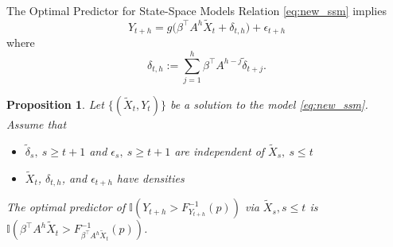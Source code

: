 \documentclass{beamer}
\newtheorem{proposition}{Proposition}
\def\I{\mathbb I}
\def\R{\mathbb R}
\begin{document}

\begin{frame}{The Optimal Predictor for State-Space Models}
    Relation \eqref{eq:new_ssm} implies
    \[
    Y_{t + h} = g\Big( \beta^\top A^h \tilde X_t + \delta_{t,h} \Big) + \epsilon_{t+h}
    \]
    where 
    \[
    \delta_{t,h}:= \sum_{j=1}^h \beta^\top A^{h - j}\tilde  \delta_{t+j}.
    \]
    \begin{proposition}
        Let $\{(\tilde X_t,Y_t)\}$ be a solution to the model \eqref{eq:new_ssm}. Assume that
        \begin{itemize}
            \item $\tilde{\delta}_s, \ s \ge t + 1$ and $\epsilon_s, \ s \ge t + 1$ are independent of $\tilde{X}_s, \ s \le t$
            \item $\tilde X_t$, $\delta_{t, h}$, and $\epsilon_{t+h}$ have densities
        \end{itemize}
        The optimal predictor of $\I(Y_{t+h}> F_{Y_{t+h}}^{-1}(p))$
        via $\tilde X_s, s\le t$ is $\I(\beta^\top A^h\tilde X_t > F_{\beta^\top A^h\tilde X_t}^{-1}(p))$.
    \end{proposition}
\end{frame}
\end{document}
